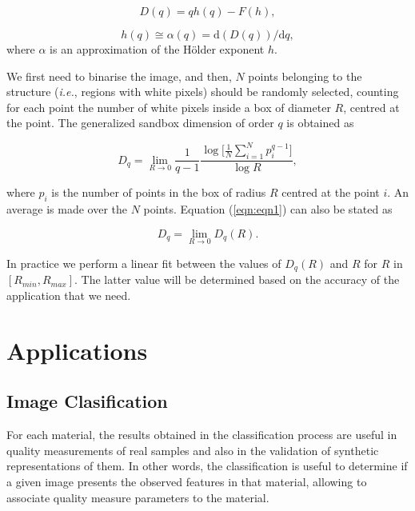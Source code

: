 \documentclass[oneside,a4paper,english,links]{article}
\begin{document}
\begin{equation}
D(q) = q h(q) - F(h),
\label{eqn:eqnLeg1}
\end{equation}

\begin{equation}
h(q) \cong \alpha(q) = \mathrm{d}(D(q))/\mathrm{d}q,
\label{eqn:eqnLeg2}
\end{equation}
where $\alpha$ is an approximation of the H\"older exponent $h$.

We first need to binarise the image, and then, $N$ points belonging to the structure ({\em i.e.}, regions with white pixels) should be randomly selected, counting for each point the number of white pixels inside a box of diameter $R$, centred at the point. The generalized sandbox dimension of order $q$ is obtained as \cite{Bert94}

\begin{equation}
D_{q} = \lim_{R\rightarrow0}{\frac{1}{q-1} \frac{\log \bigg \lbrack\frac{1}{N}\displaystyle \sum_{i=1}^{N}{p_{i}^{q-1}}\bigg \rbrack}{\log R}},
\label{eqn:eqn1}
\end{equation}

where $p_{i}$ is the number of points in the box of radius $R$ centred at the point $i$. An average is made over the $N$ points. Equation (\ref{eqn:eqn1}) can also be stated as

\begin{equation}
D_{q} = \lim_{R\rightarrow0}{D_{q}(R)}.
\end{equation}

In practice we perform a linear fit between the values of $D_{q}(R)$ and $R$ for $R$ in $[R_{min}, R_{max}]$. The latter value will be determined based on the accuracy of the application that we need.


\section{Applications}

\subsection{Image Clasification}
For each material, the results obtained in the classification process are useful in quality measurements of real samples and also in the validation of synthetic representations of them. In other words, the classification is useful to determine if a given image presents the observed features in that material, allowing to associate quality measure parameters to the material.
\end{document}
